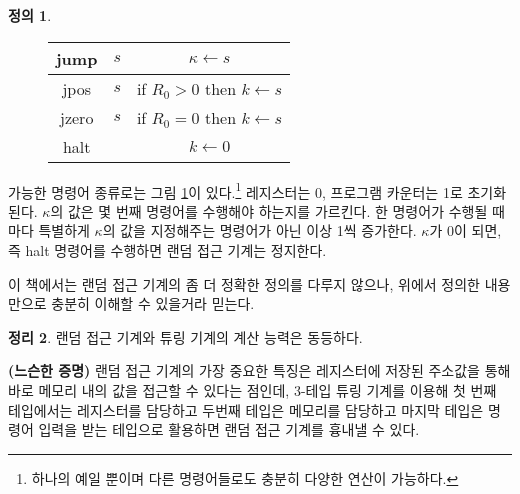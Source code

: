 \documentclass[b5paper, 11pt]{book}
\theoremstyle{definition}
\newtheorem{defn}{정의}[chapter]
\newtheorem{thm}[defn]{정리}
\newenvironment{pf*}{\pushQED{\qed}\pf}
{\popQED\endpf}
\begin{document}
\begin{defn}
\begin{figure}[!ht]
\begin{tabular}{ ccc }
            \hline 
            jump & $s$ & $\kappa \gets s$ \\ 
            \hline 
            jpos & $s$ & if $R_0 > 0$ then $k \gets s$ \\ 
            \hline 
            jzero & $s$ & if $R_0 = 0$ then $k \gets s$ \\ 
            \hline 
            halt & & $k \gets 0$
        \end{tabular}
        \caption{}
        \label{iiiii}
    \end{figure}
    가능한 명령어 종류로는 그림 \ref{iiiii}이 있다.\footnote{하나의 예일 뿐이며 다른 명령어들로도 충분히 다양한 연산이 가능하다.} 레지스터는 0, 프로그램 카운터는 1로 초기화 된다. $\kappa$의 값은 몇 번째 명령어를 수행해야 하는지를 가르킨다. 한 명령어가 수행될 때마다 특별하게 $\kappa$의 값을 지정해주는 명령어가 아닌 이상 1씩 증가한다. $\kappa$가 0이 되면, 즉 halt 명령어를 수행하면 랜덤 접근 기계는 정지한다.
\end{defn}
이 책에서는 랜덤 접근 기계의 좀 더 정확한 정의를 다루지 않으나, 위에서 정의한 내용만으로  충분히 이해할 수 있을거라 믿는다. 
\begin{thm}
    랜덤 접근 기계와 튜링 기계의 계산 능력은 동등하다.
\end{thm}
\begin{pf*}
    \textbf{(느슨한 증명)} 랜덤 접근 기계의 가장 중요한 특징은 레지스터에 저장된 주소값을 통해 바로 메모리 내의 값을 접근할 수 있다는 점인데, $3$-테입 튜링 기계를 이용해 첫 번째 테입에서는 레지스터를 담당하고 두번째 테입은 메모리를 담당하고 마지막 테입은 명령어 입력을 받는 테입으로 활용하면 랜덤 접근 기계를 흉내낼 수 있다.
\end{pf*}
\end{document}
